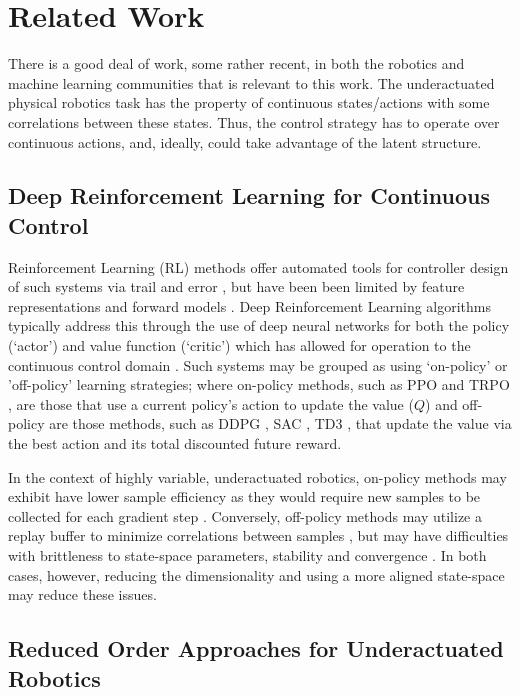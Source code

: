 \documentclass[letterpaper, 10 pt, conference]{ieeeconf}
\begin{document}
\pagebreak
\section{Related Work}

There is a good deal of work, some rather recent, in both the robotics and machine learning communities that is relevant to this work.  The underactuated physical robotics task has the property of continuous states/actions with some correlations between these states.   Thus, the control strategy has to operate over continuous actions, and, ideally, could take advantage of the latent structure. 

\subsection{Deep Reinforcement Learning for Continuous Control}

Reinforcement Learning (RL) methods offer automated tools for controller design of such systems via trail and error \cite{sutton1998reinforcement}, but have been been limited by feature representations and forward models \cite{duan2016benchmarking}. 
Deep Reinforcement Learning algorithms typically address this through the use of deep neural networks for both the policy (`actor') and value function (`critic') which has allowed for operation to the continuous control domain \cite{mnih2015human, DDPG}. 
Such systems may be grouped as using `on-policy' or 'off-policy' learning strategies; where on-policy methods, such as PPO \cite{PPO} and TRPO \cite{TRPO}, are those that use a current policy's action to update the value ($Q$) and off-policy are those methods, such as DDPG \cite{DDPG}, SAC \cite{SAC}, TD3 \cite{TD3}, that update the value via the best action and its total discounted future reward.  

In the context of highly variable, underactuated robotics, on-policy methods may exhibit have lower sample efficiency as they would require new samples to be collected for each gradient step \cite{SAC}.   Conversely, off-policy methods may utilize a replay buffer to minimize correlations between samples \cite{DDPG}, but may have difficulties with brittleness to state-space parameters, stability and convergence \cite{bhatnagar2009convergent}.  In both cases, however, reducing the dimensionality and using a more aligned state-space may reduce these issues. 


\subsection{Reduced Order Approaches for Underactuated Robotics}
\end{document}
